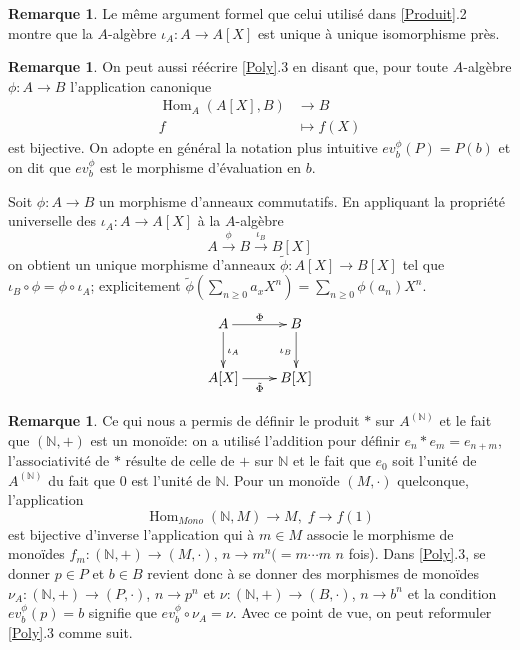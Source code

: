 \documentclass[a4paper, oneside, 12pt]{book}
\theoremstyle{theoremeStyle} %
\theoremstyle{definition} %
\newtheorem{remarque}[theoreme]{Remarque}
\DeclareMathOperator{\SHom}{Hom}
\newcommand{\N}{\mathbb{N}}
\begin{document}
\begin{remarque}Le même argument  formel que celui utilisé dans \ref{Produit}.2 montre que la $A$-algèbre $\iota_A:A\rightarrow A[X]$ est unique à unique isomorphisme  près.\end{remarque}

	\begin{remarque}On peut aussi réécrire \ref{Poly}.3 en disant que, pour toute $A$-algèbre $\phi:A\rightarrow B$  l'application canonique
		\begin{align*} \SHom_A(A[X],B) &\to B \\ f &\mapsto f(X)\end{align*}
	est bijective. On adopte en général la notation plus intuitive $ev_{b}^\phi(P)=P( b)$ et on dit que $ev_{b}^\phi$ est le morphisme d'évaluation en $b$.\end{remarque}

 Soit $\phi:A  \rightarrow B $ un morphisme  d'anneaux commutatifs. En appliquant la propriété universelle des $\iota_A:A\rightarrow A[X]$  à la $A$-algèbre
$$A\overset{\phi}{\to} B\overset{\iota_B}{\to}B[X]$$
on obtient un unique morphisme d'anneaux  $\tilde{\phi}:A[X]\rightarrow B[X]$ tel que $\iota_B\circ \phi=\phi\circ \iota_A$; explicitement $\tilde{\phi}(\sum_{n\geq 0}a_xX^n)=\sum_{n\geq 0}\phi(a_n)X^n$.\\

	$$ \xymatrix{ A\ar[r]^\Phi \ar[d]^{\iota_A} & B \ar[d]_{\iota_B} \\ A[X]\ar[r]_{\tilde{\Phi}} & B[X] } $$


   \begin{remarque}\label{RemarqueConstr} Ce qui nous a permis de définir le produit $*$ sur $A^{(\N)}$ et le fait que $(\N,+)$ est un monoïde: on a utilisé l'addition pour définir $e_n*e_m=e_{n+m}$, l'associativité de $*$ résulte de celle de $+$ sur $\N$ et le fait que $e_0$ soit l'unité de $A^{(\N)}$ du fait que $0$ est l'unité de $\N$.  Pour un monoïde $(M,\cdot)$ quelconque, l'application
 $$\SHom_{Mono}(\N,M)\rightarrow M,\; f\rightarrow f(1)$$
   est bijective d'inverse l'application qui à $m\in M$ associe le morphisme de monoïdes $f_m:(\N,+)\rightarrow (M,\cdot)$, $n\rightarrow m^n(=m\cdots m$ $n$ fois). Dans \ref{Poly}.3, se donner $p\in P$ et $b\in B$ revient donc à se donner des morphismes de monoïdes $\nu_A:(\N,+)\rightarrow (P,\cdot)$, $n\rightarrow p^n$ et $\nu:(\N,+)\rightarrow (B,\cdot)$, $n\rightarrow b^n$ et la condition $ev^\phi_b(p)=b$ signifie que $ev^\phi_b\circ \nu_A=\nu$. Avec ce point de vue, on peut reformuler \ref{Poly}.3 comme suit. \end{remarque}
\end{document}
